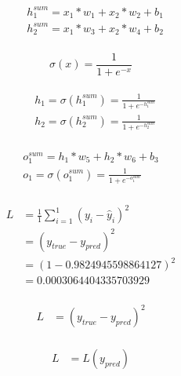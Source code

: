 \documentclass[a4paper,12pt]{article}
\begin{document}
\begin{equation*}
\begin{aligned}
& h^{sum}_{1} = x_1 * w_1 + x_2 * w_2 + b_1 \\
& h^{sum}_{2} = x_1 * w_3 + x_2 * w_4 + b_2
\end{aligned}
\end{equation*}
\\[1cm]
\begin{equation*}
\sigma(x) = \frac{1}{1 + e^{-x}}
\end{equation*}
\\[1cm]

\begin{equation*}
\begin{aligned}
& h_{1} = \sigma(h^{sum}_{1}) = \frac{1}{1 + e^{-h^{sum}_{1}}}\\[0.2cm]
& h_{2} = \sigma(h^{sum}_{2}) = \frac{1}{1 + e^{-h^{sum}_{2}}}
\end{aligned}
\end{equation*}
\\[1cm]

\begin{equation*}
\begin{aligned}
o^{sum}_{1} = h_{1} * w_5 + h_{2} * w_6 + b_3 \\
o_{1} = \sigma(o^{sum}_{1}) = \frac{1}{1 + e^{-o^{sum}_{1}}}
\end{aligned}
\end{equation*}
\\[1cm]

\begin{equation*}
\begin{aligned}
L &= \frac{1}{1}\sum_{i=1}^1{(y_i - \hat{y}_i)^2} \\
  &= (y_{true} - y_{pred})^2 \\
  &= (1 - 0.9824945598864127)^2 \\
  &= 0.0003064404335703929
\end{aligned}
\end{equation*}
\\[1cm]

\begin{equation*}
\begin{aligned}
L &= (y_{true} - y_{pred})^2
\end{aligned}
\end{equation*}
\\[1cm]

\begin{equation*}
\begin{aligned}
L &= L(y_{pred})
\end{aligned}
\end{equation*}
\end{document}
